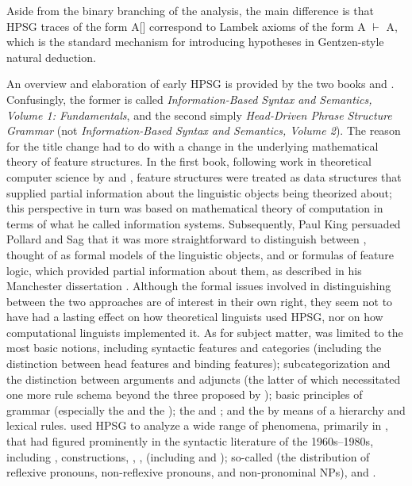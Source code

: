 \documentclass[output=paper
 	        ,biblatex
                ,babelshorthands
                ,newtxmath
                ,draftmode
                ,colorlinks, citecolor=brown
]{langscibook}
\begin{document}
\noindent
Aside from the binary branching of the \citeauthor{Lambek1958} analysis, the main difference is that HPSG traces of
the form A[\slasch {}] correspond
to Lambek axioms of the form A $\vdash$ A, which is the standard mechanism for introducing hypotheses in Gentzen-style natural deduction.

An overview and elaboration of early HPSG is provided by the two books \citet{ps} and \citet{ps2}. Confusingly, the former is called \textit{Information-Based Syntax and Semantics, Volume 1: Fundamentals}, and the second simply \textit{Head-Driven Phrase Structure Grammar} (not \textit{Information-Based Syntax and Semantics, Volume 2}). The reason for the title change had to do with a change in the underlying mathematical theory of feature structures. In the first book, following work in theoretical computer science by \citet{RoundsKasper1986} and \citet{MoshierRounds1987}, feature structures were treated as data structures that supplied partial information about the linguistic objects being theorized about; this perspective in turn was based on  mathematical theory of computation in terms of what he called information systems. Subsequently, Paul King persuaded Pollard and Sag that it was more straightforward to distinguish between , thought of as formal models of the linguistic objects, and  or formulas of feature logic, which provided partial information about them, as described in his Manchester dissertation \citep{King89}.  Although the formal issues involved in distinguishing between the two approaches are of interest in their own right, they seem not to have had a lasting effect on how theoretical linguists used HPSG, nor on how computational linguists implemented it. As for subject matter, \citet{ps} was limited to the most basic notions, including syntactic features and categories (including the distinction between head features and binding features); subcategorization and the distinction between arguments and adjuncts (the latter of which necessitated one more rule schema beyond the three proposed by \citealt{Pollard85a-u}); basic principles of grammar (especially the  and the ); the  and ; and the  by means of a  hierarchy and lexical rules. \citet{ps2} used HPSG to analyze a wide range of phenomena, primarily in , that had figured prominently in the syntactic literature of the 1960s--1980s, including ,  constructions, , ,  (including  and ); so-called  (the distribution of reflexive pronouns, non-reflexive pronouns, and non-pronominal NPs), and . 
\end{document}

